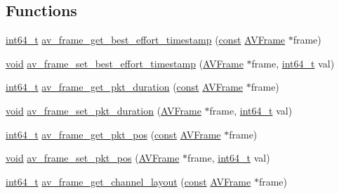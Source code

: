 \subsection*{Functions}
\begin{DoxyCompactItemize}
\item 
\hyperlink{lib-src_2ffmpeg_2win32_2stdint_8h_a67a9885ef4908cb72ce26d75b694386c}{int64\+\_\+t} \hyperlink{group__lavu__frame_gacb9d9082c10e625e51a68caceabd4458}{av\+\_\+frame\+\_\+get\+\_\+best\+\_\+effort\+\_\+timestamp} (\hyperlink{getopt1_8c_a2c212835823e3c54a8ab6d95c652660e}{const} \hyperlink{struct_a_v_frame}{A\+V\+Frame} $\ast$frame)
\item 
\hyperlink{sound_8c_ae35f5844602719cf66324f4de2a658b3}{void} \hyperlink{group__lavu__frame_ga8c4a32b4b0314432050a4bbe29171070}{av\+\_\+frame\+\_\+set\+\_\+best\+\_\+effort\+\_\+timestamp} (\hyperlink{struct_a_v_frame}{A\+V\+Frame} $\ast$frame, \hyperlink{lib-src_2ffmpeg_2win32_2stdint_8h_a67a9885ef4908cb72ce26d75b694386c}{int64\+\_\+t} val)
\item 
\hyperlink{lib-src_2ffmpeg_2win32_2stdint_8h_a67a9885ef4908cb72ce26d75b694386c}{int64\+\_\+t} \hyperlink{group__lavu__frame_ga877a6a0703b74e7e27f196313e160d60}{av\+\_\+frame\+\_\+get\+\_\+pkt\+\_\+duration} (\hyperlink{getopt1_8c_a2c212835823e3c54a8ab6d95c652660e}{const} \hyperlink{struct_a_v_frame}{A\+V\+Frame} $\ast$frame)
\item 
\hyperlink{sound_8c_ae35f5844602719cf66324f4de2a658b3}{void} \hyperlink{group__lavu__frame_gaebd80bc8675289737641235473bdc19d}{av\+\_\+frame\+\_\+set\+\_\+pkt\+\_\+duration} (\hyperlink{struct_a_v_frame}{A\+V\+Frame} $\ast$frame, \hyperlink{lib-src_2ffmpeg_2win32_2stdint_8h_a67a9885ef4908cb72ce26d75b694386c}{int64\+\_\+t} val)
\item 
\hyperlink{lib-src_2ffmpeg_2win32_2stdint_8h_a67a9885ef4908cb72ce26d75b694386c}{int64\+\_\+t} \hyperlink{group__lavu__frame_ga2f09c3e454ca78320a8f3be17d0473c1}{av\+\_\+frame\+\_\+get\+\_\+pkt\+\_\+pos} (\hyperlink{getopt1_8c_a2c212835823e3c54a8ab6d95c652660e}{const} \hyperlink{struct_a_v_frame}{A\+V\+Frame} $\ast$frame)
\item 
\hyperlink{sound_8c_ae35f5844602719cf66324f4de2a658b3}{void} \hyperlink{group__lavu__frame_ga6c137c59cc65afdf2dea1fef903a69e1}{av\+\_\+frame\+\_\+set\+\_\+pkt\+\_\+pos} (\hyperlink{struct_a_v_frame}{A\+V\+Frame} $\ast$frame, \hyperlink{lib-src_2ffmpeg_2win32_2stdint_8h_a67a9885ef4908cb72ce26d75b694386c}{int64\+\_\+t} val)
\item 
\hyperlink{lib-src_2ffmpeg_2win32_2stdint_8h_a67a9885ef4908cb72ce26d75b694386c}{int64\+\_\+t} \hyperlink{group__lavu__frame_gacefc94a29e6741998e408363c8531909}{av\+\_\+frame\+\_\+get\+\_\+channel\+\_\+layout} (\hyperlink{getopt1_8c_a2c212835823e3c54a8ab6d95c652660e}{const} \hyperlink{struct_a_v_frame}{A\+V\+Frame} $\ast$frame)

\end{DoxyCompactItemize}
